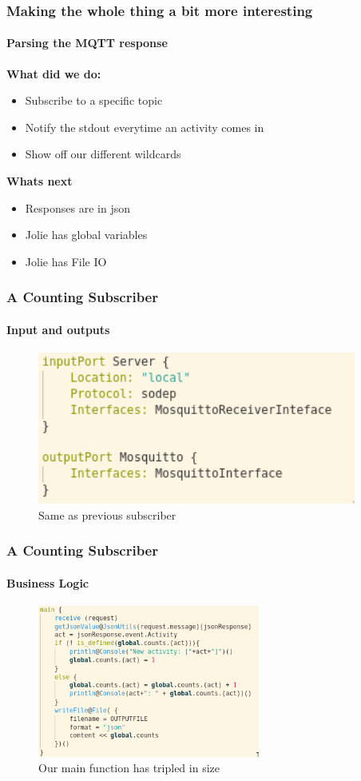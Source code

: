 \documentclass{beamer}
\begin{document}
    \begin{frame}[t]
        \frametitle{Making the whole thing a bit more interesting}
        \framesubtitle{Parsing the MQTT response}
        \textbf{What did we do:}   
        \begin{itemize}
            \item Subscribe to a specific topic
            \item Notify the stdout everytime an activity comes in
            \item Show off our different wildcards
        \end{itemize}
        \textbf{Whats next}   
        \begin{itemize}
            \item Responses are in json
            \item Jolie has global variables
            \item Jolie has File IO
        \end{itemize}
    \end{frame}
    \begin{frame}[t]
        \frametitle{A Counting Subscriber}
        \framesubtitle{Input and outputs}
        \begin{figure}[!h]
            \centering
            \includegraphics[height=5cm]{images3/countio.png}
            \caption{Same as previous subscriber}
            \label{fig:a3p2}
        \end{figure}
    \end{frame}
    \begin{frame}[t]
        \frametitle{A Counting Subscriber}
        \framesubtitle{Business Logic}
        \begin{figure}[!h]
            \centering
            \includegraphics[height=5cm]{images3/countlogic.png}
            \caption{Our main function has tripled in size}
            \label{fig:a3p2}
        \end{figure}
    \end{frame}
\end{document}
